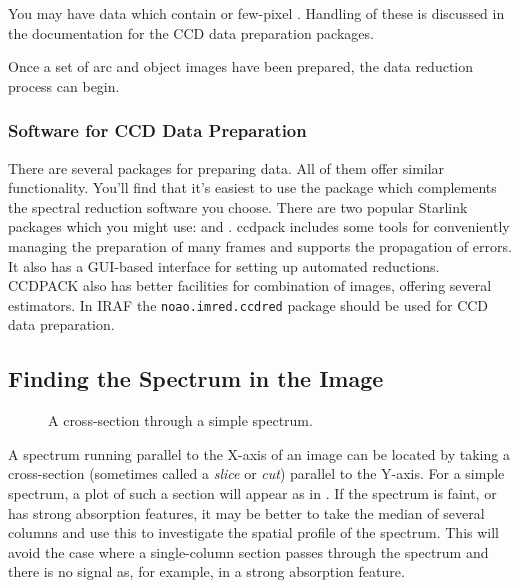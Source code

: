 You may have data which contain  or
few-pixel .
Handling of these is discussed in the documentation for the CCD data
preparation packages.

Once a set of arc and object images have been prepared, the data
reduction process can begin.


\subsubsection{Software for CCD Data Preparation}

There are several packages for preparing  data.
All of them offer similar functionality.
You'll find that it's easiest to use the package which complements
the spectral reduction software you choose.
There are two popular Starlink packages which you might use:
 and \@.
{\sc ccdpack} includes some tools for conveniently managing the preparation
of many frames and supports the propagation of errors.
It also has a GUI-based interface for setting up automated reductions.
CCDPACK also has better facilities for combination of images, offering
several estimators.
In IRAF the {\tt noao.imred.ccdred} package should be used for CCD
data preparation.


\subsection{Finding the Spectrum in the Image}

\begin{figure}
\begin{center}
{\leavevmode\epsfysize=136mm}

\parbox{140mm}{
\caption{A cross-section through a simple spectrum.}
\label{fi_spectrum_locate}
}
\end{center}
\end{figure}

A spectrum running parallel to the X-axis of an image can
be located by taking a cross-section (sometimes called a {\em slice} or {\em
cut}) parallel to the Y-axis.  For a simple spectrum, a plot of such a
section will appear as in .
If the spectrum is
faint, or has strong absorption features, it may be better to take the
median of several columns and use this to investigate the spatial profile
of the spectrum.  This will avoid the case where a single-column section
passes through the spectrum and there is no signal as, for example, in a
strong absorption feature.



